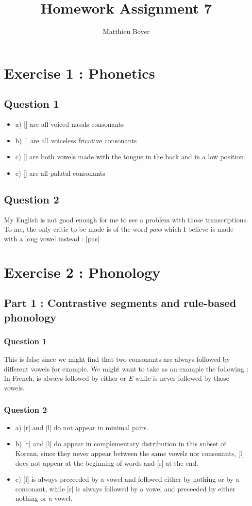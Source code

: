 \documentclass{cours}
\title{Homework Assignment 7}
\author{Matthieu Boyer}
\begin{document}
\section{Exercise 1 : Phonetics}
\subsection{Question 1}
\begin{itemize}
    \item a) [] are all voiced nasals consonants
    \item b) [] are all voiceless fricative consonants
    \item c) [] are both vowels made with the tongue in the back and in a low position. 
    \item c) [] are all palatal consonants
\end{itemize}

\subsection{Question 2}
My English is not good enough for me to see a problem with those transcriptions. To me, the only critic to be made is of the word \textsl{pass} which I believe is made with a long vowel instead : [pa\textipa{:}s]


\section{Exercise 2 : Phonology}
\subsection{Part 1 : Contrastive segments and rule-based phonology}
\subsubsection{Question 1}
This is false since we might find that two consonants are always followed by different vowels for example. We might want to take as an example the following : 
In French,  is always followed by either  or \textsl{E} while  is never followed by those vowels. 

\subsubsection{Question 2}
\begin{itemize}
    \item a) [r] and [l] do not appear in minimal pairs. 
    \item b) [r] and [l] do appear in complementary distribution in this subset of Korean, since they never appear between the same vowels nor consonants, [l] does not appear at the beginning of words and [r] at the end.
    \item c) [l] is always preceeded by a vowel and followed either by nothing or by a consonant, while [r] is always followed by a vowel and preceeded by either nothing or a vowel.
\end{itemize}
\end{document}
